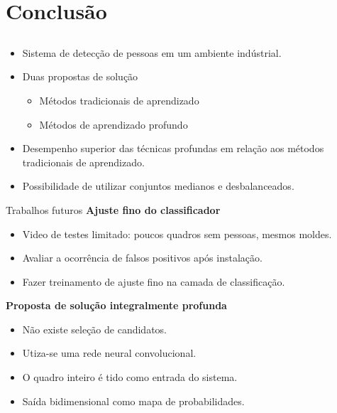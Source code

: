 \section{Conclusão}

\subsection{}
\begin{frame}{\insertsection}
	\begin{itemize}
		\item Sistema de detecção de pessoas em um ambiente indústrial.
		\item Duas propostas de solução
		\begin{itemize}
			\item Métodos tradicionais de aprendizado
			\item Métodos de aprendizado profundo
		\end{itemize}

		\item Desempenho superior das técnicas profundas em relação aos métodos tradicionais de aprendizado.
		\item Possibilidade de utilizar conjuntos medianos e desbalanceados.
	\end{itemize}
\end{frame}

\begin{frame}{Trabalhos futuros}
	\textbf{Ajuste fino do classificador}\\
	\begin{itemize}
		\item Video de testes limitado: poucos quadros sem pessoas, mesmos moldes.
		\item Avaliar a ocorrência de falsos positivos após instalação.
		\item Fazer treinamento de ajuste fino na camada de classificação.
	\end{itemize} 

	\pause

	\textbf{Proposta de solução integralmente profunda}\\
	\begin{itemize}
		\item Não existe seleção de candidatos.
		\item Utiza-se uma rede neural convolucional.
		\item O quadro inteiro é tido como entrada do sistema.
		\item Saída bidimensional como mapa de probabilidades.
	\end{itemize}
\end{frame}
